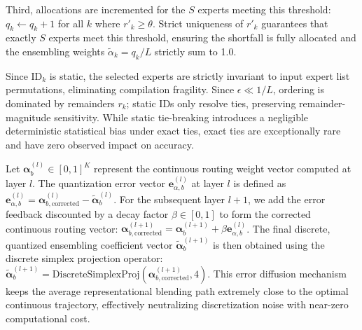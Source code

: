 Third, allocations are incremented for the $S$ experts meeting this threshold: $q_k \leftarrow q_k + 1$ for all $k$ where $r'_k \geq \theta$. Strict uniqueness of $r'_k$ guarantees that exactly $S$ experts meet this threshold, ensuring the shortfall is fully allocated and the ensembling weights $\tilde{\alpha}_k = q_k / L$ strictly sum to 1.0. 

Since $\text{ID}_k$ is static, the selected experts are strictly invariant to input expert list permutations, eliminating compilation fragility. Since $\epsilon \ll 1/L$, ordering is dominated by remainders $r_k$; static IDs only resolve ties, preserving remainder-magnitude sensitivity. While static tie-breaking introduces a negligible deterministic statistical bias under exact ties, exact ties are exceptionally rare and have zero observed impact on accuracy. 

Let $\boldsymbol{\alpha}_b^{(l)} \in [0, 1]^K$ represent the continuous routing weight vector computed at layer $l$. The quantization error vector $\mathbf{e}_{\alpha, b}^{(l)}$ at layer $l$ is defined as $\mathbf{e}_{\alpha, b}^{(l)} = \boldsymbol{\alpha}_{b, \text{corrected}}^{(l)} - \tilde{\boldsymbol{\alpha}}_b^{(l)}$. For the subsequent layer $l+1$, we add the error feedback discounted by a decay factor $\beta \in [0, 1]$ to form the corrected continuous routing vector: $\boldsymbol{\alpha}_{b, \text{corrected}}^{(l+1)} = \boldsymbol{\alpha}_b^{(l+1)} + \beta \mathbf{e}_{\alpha, b}^{(l)}$. The final discrete, quantized ensembling coefficient vector $\tilde{\boldsymbol{\alpha}}_b^{(l+1)}$ is then obtained using the discrete simplex projection operator: $\tilde{\boldsymbol{\alpha}}_b^{(l+1)} = \text{DiscreteSimplexProj}\left( \boldsymbol{\alpha}_{b, \text{corrected}}^{(l+1)}, 4 \right)$.
This error diffusion mechanism keeps the average representational blending path extremely close to the optimal continuous trajectory, effectively neutralizing discretization noise with near-zero computational cost.

